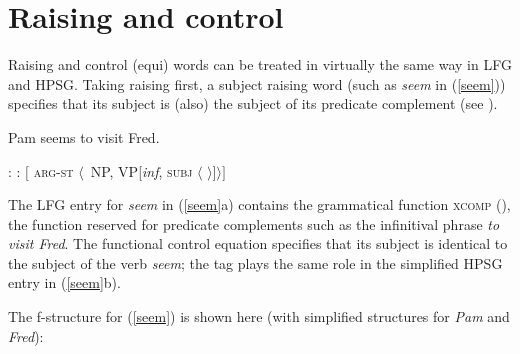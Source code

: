 
\section{Raising and control}

Raising and control (equi) words can be treated in virtually the same way in LFG and HPSG. Taking raising first, a subject raising word (such as \textit{seem} in (\ref{seem})) specifies that its subject is (also) the subject of its predicate complement (see ).  

\begin{exe} 
\ex	\label{seem}
Pam seems to visit Fred.
\begin{xlist} 
\ex	
{}: \qquad {}
\ex 
{}:  \qquad  $[$ \textsc{arg-st} $\langle$ \,NP, VP[\textit{inf}, \textsc{subj} $\langle$  $ \rangle ] \rangle ]$
\end{xlist}
\end{exe}
The LFG entry for \textit{seem} in (\ref{seem}a) contains the grammatical function \textsc{xcomp} (), the function reserved for predicate complements such as the infinitival phrase \textit{to visit Fred}.  The functional control equation specifies that its subject is identical to the subject of the verb \textit{seem}; the  tag  plays the same role in the simplified HPSG entry in (\ref{seem}b).  

The f-structure for (\ref{seem}) is shown here (with simplified structures for \textit{Pam} and \textit{Fred}):

\begin{exe}
\ex \label{seemfs} 
\end{exe}


